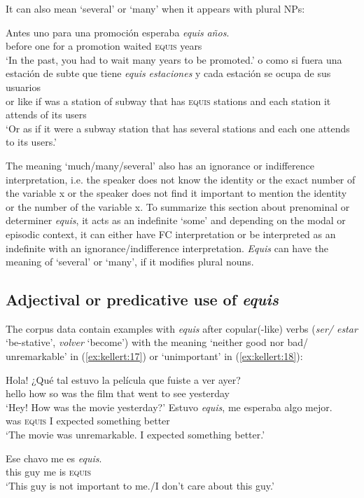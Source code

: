 \documentclass[output=paper]{langsci/langscibook}
\begin{document}
It can also mean ‘several’ or ‘many’ when it appears with plural NPs:

\ea\label{ex:kellert:15}
\gll  Antes uno para una promoción esperaba \textit{equis} \textit{años}.\\
before one for a promotion waited \textsc{equis} years\\
\glt ‘In the past, you had to wait many years to be promoted.’
\ex 
\gll  o como si fuera una estación de subte que tiene \textit{equis} \textit{estaciones} y cada estación se ocupa de sus usuarios\\
or like if was a station of subway that has \textsc{equis} stations and each station it attends of its users\\
\glt ‘Or as if it were a subway station that has several stations and each one attends to its users.’
\z

The meaning ‘much/many/several’ also has an ignorance or indifference interpretation, i.e. the speaker does not know the identity or the exact number of the variable x or the speaker does not find it important to mention the identity or the number of the variable x.
To summarize this section about prenominal or determiner \textit{equis}, it acts as an indefinite ‘some’ and depending on the modal or episodic context, it can either have FC interpretation or be interpreted as an indefinite with an ignorance/indifference interpretation. \textit{Equis} can have the meaning of ‘several’ or ‘many’, if it modifies plural nouns.

\subsection{Adjectival or predicative use of \textit{equis}}\label{sec:kellert:2.2}
The corpus data contain examples with \textit{equis} after copular(-like) verbs (\textit{ser/ estar} ‘be-stative’, \textit{volver} ‘become’) with the meaning ‘neither good nor bad/ unremarkable’ in (\ref{ex:kellert:17}) or ‘unimportant’ in (\ref{ex:kellert:18}):

\ea\label{ex:kellert:17}
\begin{xlist}
Hola! {¿}Qué tal estuvo la película que fuiste a ver ayer?\\
hello how so was the film that went to see yesterday\\
\glt `Hey! How was the movie yesterday?'
\gll  Estuvo \textit{equis}, me esperaba algo mejor.\\
was \textsc{equis} I expected something better\\
\glt `The movie was unremarkable. I expected something better.’
\end{xlist}
\ex \label{ex:kellert:18}
\gll  Ese chavo me es \textit{equis}.\\
this guy me is \textsc{equis}\\
\glt ‘This guy is not important to me./I don’t care about this guy.’
\z
\end{document}
